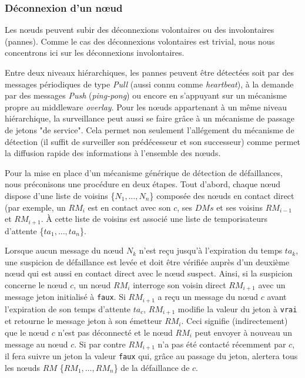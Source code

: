 \subsubsection*{Déconnexion d'un n{\oe}ud} 

Les n{\oe}uds peuvent subir des déconnexions volontaires ou des involontaires (pannes). Comme le cas des déconnexions volontaires est trivial, nous nous concentrons ici sur les déconnexions involontaires.

Entre deux niveaux hiérarchiques, les pannes peuvent être détectées soit par des messages périodiques de type \textit{Pull} (aussi connu comme \textit{heartbeat}), à la demande par des messages \textit{Push} (\textit{ping-pong}) \cite{Chandra96} ou encore en s'appuyant sur un mécanisme propre au middleware \textit{overlay}. Pour les n{\oe}uds appartenant à un même niveau hiérarchique, la surveillance peut aussi se faire grâce à un mécanisme de passage de jetons "de service". Cela permet non seulement l'allégement du mécanisme de détection (il suffit de surveiller son prédécesseur et son successeur) comme permet la diffusion rapide des informations à l'ensemble des n{\oe}uds.

Pour la mise en place d'un mécanisme générique de détection de défaillances, nous préconisons une procédure en deux étapes. 
Tout d'abord, chaque n{\oe}ud dispose d'une liste de voisins \{$N_1,…,N_n$\} composée des n{\oe}uds en contact direct (par exemple, un $RM_i$ est en contact avec son $c$, ses $DMs$ et ses voisins $RM_{i-1}$ et $RM_{i+1}$. À cette liste de voisins est associé une liste de temporisateurs d'attente \{$ta_1,…,ta_n$\}. 

Lorsque aucun message du n{\oe}ud $N_k$ n'est reçu jusqu'à l'expiration du temps $ta_k$, une suspicion de défaillance est levée et doit être vérifiée auprès d'un deuxième n{\oe}ud qui est aussi en contact direct avec le n{\oe}ud suspect. Ainsi, si la suspicion concerne le n{\oe}ud $c$, un n{\oe}ud $RM_i$ interroge son voisin direct $RM_{i+1}$ avec un message jeton initialisé à \texttt{faux}. Si $RM_{i+1}$ a reçu un message du n{\oe}ud $c$ avant l'expiration de son temps d'attente $ta_c$, $RM_{i+1}$ modifie la valeur du jeton à \texttt{vrai} et retourne le message jeton à son émetteur $RM_i$. Ceci signifie (indirectement) que le n{\oe}ud $c$ n'est pas déconnecté et le n{\oe}ud $RM_i$ peut envoyer à nouveau un message au n{\oe}ud $c$. Si par contre $RM_{i+1}$ n'a pas été contacté récemment par $c$, il fera suivre un jeton la valeur \texttt{faux} qui, grâce au passage du jeton, alertera tous les n{\oe}uds $RM$ \{$RM_1,…,RM_n$\} de la défaillance de $c$.

